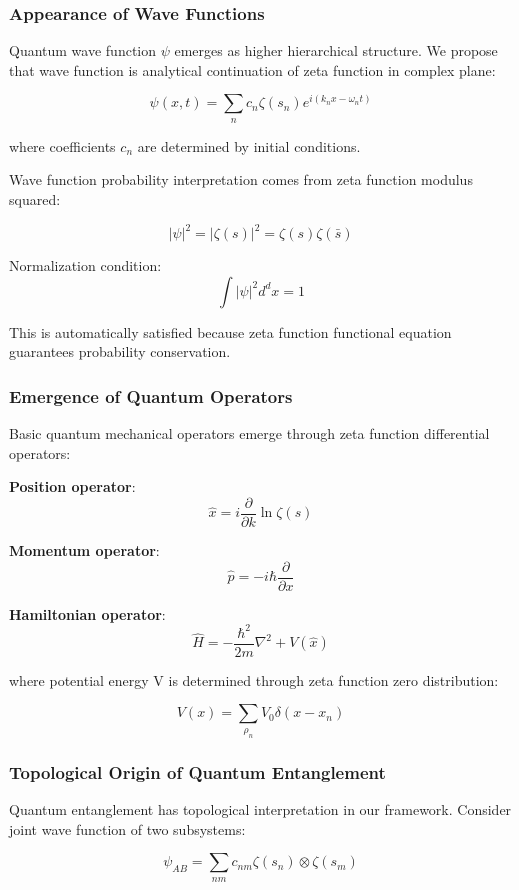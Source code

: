 \documentclass[12pt,a4paper]{article}
\begin{document}
\subsubsection{Appearance of Wave Functions}

Quantum wave function $\psi$ emerges as higher hierarchical structure. We propose that wave function is analytical continuation of zeta function in complex plane:

$$\psi(x,t) = \sum_{n} c_n \zeta(s_n) e^{i(k_n x - \omega_n t)}$$

where coefficients $c_n$ are determined by initial conditions.

Wave function probability interpretation comes from zeta function modulus squared:

$$|\psi|^2 = |\zeta(s)|^2 = \zeta(s) \zeta(\bar{s})$$

Normalization condition:
$$\int |\psi|^2 d^dx = 1$$

This is automatically satisfied because zeta function functional equation guarantees probability conservation.

\subsubsection{Emergence of Quantum Operators}

Basic quantum mechanical operators emerge through zeta function differential operators:

\textbf{Position operator}:
$$\hat{x} = i \frac{\partial}{\partial k} \ln \zeta(s)$$

\textbf{Momentum operator}:
$$\hat{p} = -i\hbar \frac{\partial}{\partial x}$$

\textbf{Hamiltonian operator}:
$$\hat{H} = -\frac{\hbar^2}{2m} \nabla^2 + V(\hat{x})$$

where potential energy V is determined through zeta function zero distribution:

$$V(x) = \sum_{\rho_n} V_0 \delta(x - x_n)$$

\subsubsection{Topological Origin of Quantum Entanglement}

Quantum entanglement has topological interpretation in our framework. Consider joint wave function of two subsystems:

$$\psi_{AB} = \sum_{nm} c_{nm} \zeta(s_n) \otimes \zeta(s_m)$$
\end{document}
